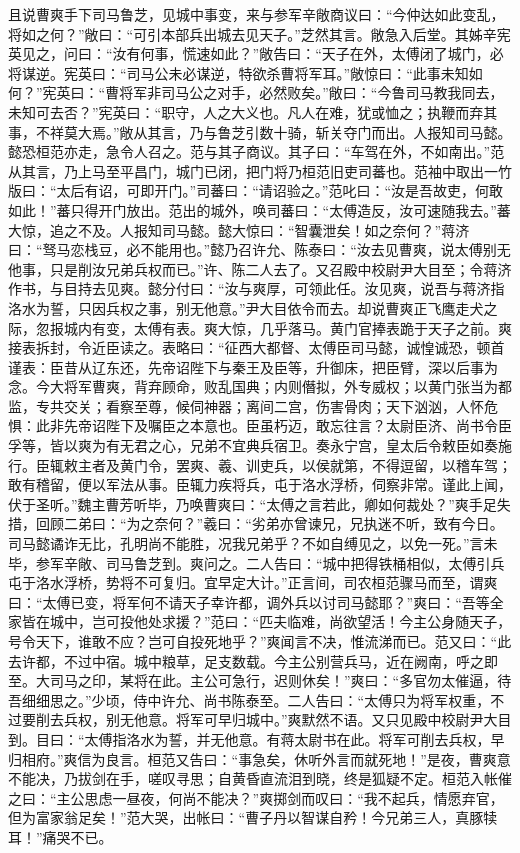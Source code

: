 且说曹爽手下司马鲁芝，见城中事变，来与参军辛敞商议曰：“今仲达如此变乱，将如之何？”敞曰：“可引本部兵出城去见天子。”芝然其言。敞急入后堂。其姊辛宪英见之，问曰：“汝有何事，慌速如此？”敞告曰：“天子在外，太傅闭了城门，必将谋逆。宪英曰：“司马公未必谋逆，特欲杀曹将军耳。”敞惊曰：“此事未知如何？”宪英曰：“曹将军非司马公之对手，必然败矣。”敞曰：“今鲁司马教我同去，未知可去否？”宪英曰：“职守，人之大义也。凡人在难，犹或恤之；执鞭而弃其事，不祥莫大焉。”敞从其言，乃与鲁芝引数十骑，斩关夺门而出。人报知司马懿。懿恐桓范亦走，急令人召之。范与其子商议。其子曰：“车驾在外，不如南出。”范从其言，乃上马至平昌门，城门已闭，把门将乃桓范旧吏司蕃也。范袖中取出一竹版曰：“太后有诏，可即开门。”司蕃曰：“请诏验之。”范叱曰：“汝是吾故吏，何敢如此！”蕃只得开门放出。范出的城外，唤司蕃曰：“太傅造反，汝可速随我去。”蕃大惊，追之不及。人报知司马懿。懿大惊曰：“智囊泄矣！如之奈何？”蒋济曰：“驽马恋栈豆，必不能用也。”懿乃召许允、陈泰曰：“汝去见曹爽，说太傅别无他事，只是削汝兄弟兵权而已。”许、陈二人去了。又召殿中校尉尹大目至；令蒋济作书，与目持去见爽。懿分付曰：“汝与爽厚，可领此任。汝见爽，说吾与蒋济指洛水为誓，只因兵权之事，别无他意。”尹大目依令而去。却说曹爽正飞鹰走犬之际，忽报城内有变，太傅有表。爽大惊，几乎落马。黄门官捧表跪于天子之前。爽接表拆封，令近臣读之。表略曰：“征西大都督、太傅臣司马懿，诚惶诚恐，顿首谨表：臣昔从辽东还，先帝诏陛下与秦王及臣等，升御床，把臣臂，深以后事为念。今大将军曹爽，背弃顾命，败乱国典；内则僭拟，外专威权；以黄门张当为都监，专共交关；看察至尊，候伺神器；离间二宫，伤害骨肉；天下汹汹，人怀危惧：此非先帝诏陛下及嘱臣之本意也。臣虽朽迈，敢忘往言？太尉臣济、尚书令臣孚等，皆以爽为有无君之心，兄弟不宜典兵宿卫。奏永宁宫，皇太后令敕臣如奏施行。臣辄敕主者及黄门令，罢爽、羲、训吏兵，以侯就第，不得逗留，以稽车驾；敢有稽留，便以军法从事。臣辄力疾将兵，屯于洛水浮桥，伺察非常。谨此上闻，伏于圣听。”魏主曹芳听毕，乃唤曹爽曰：“太傅之言若此，卿如何裁处？”爽手足失措，回顾二弟曰：“为之奈何？”羲曰：“劣弟亦曾谏兄，兄执迷不听，致有今日。司马懿谲诈无比，孔明尚不能胜，况我兄弟乎？不如自缚见之，以免一死。”言未毕，参军辛敞、司马鲁芝到。爽问之。二人告曰：“城中把得铁桶相似，太傅引兵屯于洛水浮桥，势将不可复归。宜早定大计。”正言间，司农桓范骤马而至，谓爽曰：“太傅已变，将军何不请天子幸许都，调外兵以讨司马懿耶？”爽曰：“吾等全家皆在城中，岂可投他处求援？”范曰：“匹夫临难，尚欲望活！今主公身随天子，号令天下，谁敢不应？岂可自投死地乎？”爽闻言不决，惟流涕而已。范又曰：“此去许都，不过中宿。城中粮草，足支数载。今主公别营兵马，近在阙南，呼之即至。大司马之印，某将在此。主公可急行，迟则休矣！”爽曰：“多官勿太催逼，待吾细细思之。”少顷，侍中许允、尚书陈泰至。二人告曰：“太傅只为将军权重，不过要削去兵权，别无他意。将军可早归城中。”爽默然不语。又只见殿中校尉尹大目到。目曰：“太傅指洛水为誓，并无他意。有蒋太尉书在此。将军可削去兵权，早归相府。”爽信为良言。桓范又告曰：“事急矣，休听外言而就死地！”是夜，曹爽意不能决，乃拔剑在手，嗟叹寻思；自黄昏直流泪到晓，终是狐疑不定。桓范入帐催之曰：“主公思虑一昼夜，何尚不能决？”爽掷剑而叹曰：“我不起兵，情愿弃官，但为富家翁足矣！”范大哭，出帐曰：“曹子丹以智谋自矜！今兄弟三人，真豚犊耳！”痛哭不已。

